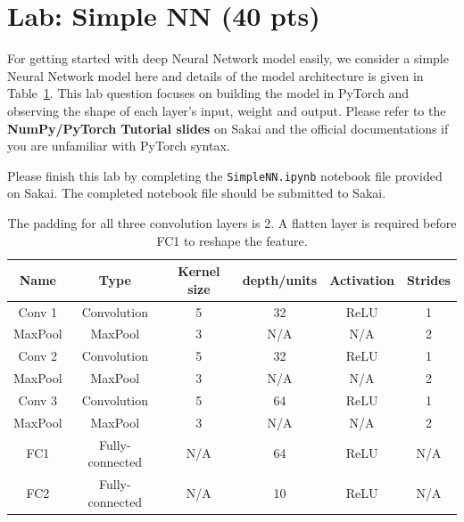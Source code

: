 \section{Lab: Simple NN (40 pts)}
For getting started with deep Neural Network model easily, we consider a simple Neural Network model here and details of the model architecture is given in Table~\ref{tab:simple NN}.
This lab question focuses on building the model in PyTorch and observing the shape of each layer's input, weight and output. Please refer to the \textbf{NumPy/PyTorch Tutorial slides} on Sakai and the official documentations if you are unfamiliar with PyTorch syntax.

Please finish this lab by completing the \texttt{SimpleNN.ipynb} notebook file provided on Sakai. {\color{blue} The completed notebook file should be submitted to Sakai.}

\begin{table} [h]
    \centering
    \begin{tabular}{|c|c|c|c|c|c|}
         \hline
         Name & Type & Kernel size & depth/units & Activation & Strides\\
         \hline
         Conv 1 & Convolution & 5 & 32 & ReLU & 1 \\
         MaxPool & MaxPool & 3 & N/A & N/A & 2 \\
         Conv 2 & Convolution & 5 & 32 & ReLU & 1 \\
         MaxPool & MaxPool & 3 & N/A & N/A & 2 \\
         Conv 3 & Convolution & 5 & 64 & ReLU & 1 \\
         MaxPool & MaxPool & 3 & N/A & N/A & 2 \\
         FC1 & Fully-connected & N/A & 64 & ReLU & N/A \\
         FC2 & Fully-connected & N/A & 10 & ReLU & N/A \\
         \hline    \end{tabular}
    \caption{The padding for all three convolution layers is 2. A flatten layer is required before FC1 to reshape the feature.}
    \label{tab:simple NN}
\end{table}

